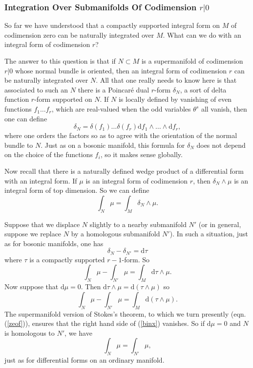 \documentclass[11pt,a4paper]{article}
\def\d{{\mathrm d}}
\begin{document}
\subsubsection{Integration Over Submanifolds Of Codimension $r|0$}\label{intsub}


So far we have understood that a compactly supported integral form on $M$ of codimension zero can be naturally integrated over $M$.
What can we do with an integral form of codimension $r$?

The answer to this question is that if $N\subset M$ is a supermanifold of codimension $r|0$ whose normal bundle is oriented, then an integral
form of codimension $r$ can be naturally integrated over $N$.  All that one really needs to know here is that associated to such an $N$ there is
a Poincar\'e dual $r$-form $\delta_N$, a sort of delta function $r$-form supported on $N$.  If $N$ is locally defined by vanishing of even functions $f_1\dots f_r$,
which are real-valued when the odd variables $\theta^s$ all vanish, 
 then one can define
\begin{equation}\label{oddo}\delta_N=\delta(f_1)\dots \delta(f_r)\d f_1\wedge\dots \wedge \d f_r,\end{equation}
where one orders the factors so as to agree with the orientation of the normal bundle to $N$.   Just as on a bosonic manifold, 
this formula for $\delta_N$ does not depend on the
choice of the functions $f_i$, so it makes sense globally. 

Now recall that there is a naturally defined wedge product of a differential form with an integral form.  If $\mu$ is an integral form of codimension $r$,
then $\delta_N \wedge\mu$ is an integral form of top dimension.  So we can define
\begin{equation}\label{subint}\int_N\mu=\int_M \delta_N\wedge \mu.\end{equation}

Suppose that we displace $N$ slightly to a nearby submanifold $N'$ (or in general, suppose we replace $N$ by a homologous submanifold $N'$).
In such a situation, just as for bosonic manifolds, one has
\begin{equation}\label{xon}\delta_N-\delta_{N'}=\d\tau\end{equation}
where $\tau$ is a compactly supported $r-1$-form.  So
\begin{equation}\label{subinx}\int_N\mu-\int_{N'}\mu=\int_M\d\tau\wedge \mu.\end{equation}
Now suppose that $\d\mu=0$.  Then $\d\tau\wedge\mu=\d(\tau\wedge\mu)$ so
\begin{equation}\label{binx}\int_N\mu-\int_{N'}\mu=\int_M\d(\tau\wedge\mu). \end{equation}
The supermanifold version of Stokes's theorem, to which we turn presently (eqn. (\ref{zeof})), ensures that the right hand side of (\ref{binx}) vanishes.
So if $\d\mu=0$ and $N$ is homologous to $N'$, we have
\begin{equation}\label{inx}\int_N\mu=\int_{N'}\mu,\end{equation}
just as for differential forms on an ordinary manifold.
\end{document}
